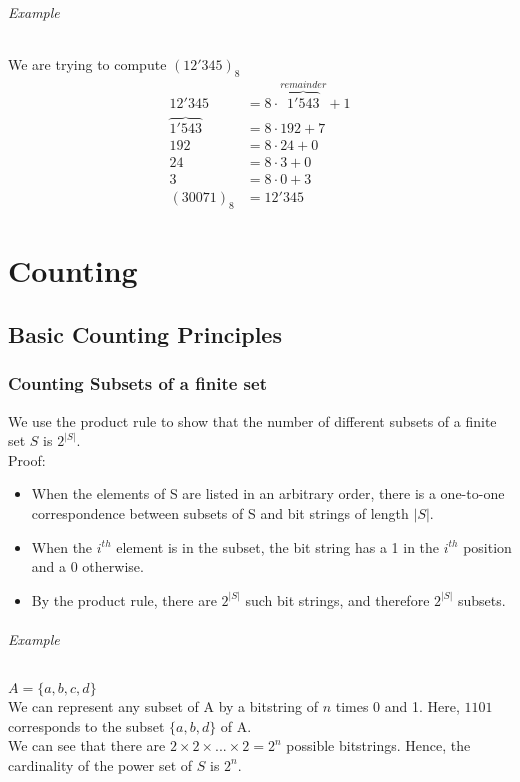 \documentclass[10pt,a4paper]{book}
\begin{document}
\paragraph*{Example}
We are trying to compute $(12'345)_8$
\begin{align*}
12'345 &= 8\cdot \overbrace{1'543}^{remainder} + 1\\
\overbrace{1'543} &= 8\cdot 192 + 7\\
192 &= 8\cdot 24 + 0\\
24 &= 8\cdot 3 + 0\\
3 &= 8\cdot 0 + 3\\
(30071)_8 &= 12'345
\end{align*}


\part{Counting}
\chapter{Basic Counting Principles}
\section{Counting Subsets of a finite set}
We use the product rule to show that the number of different subsets of a finite set $S$ is $2^{|S|}$.\\
Proof:
\begin{itemize}
\item When the elements of S are listed in an arbitrary order, there is a one-to-one correspondence between subsets of S and bit strings of length $|S|$.
\item When the $i^{th}$ element is in the subset, the bit string has a 1 in the $i^{th}$ position and a 0 otherwise.
\item By the product rule, there are $2^{|S|}$ such bit strings, and therefore $2^{|S|}$ subsets.
\end{itemize}
\paragraph*{Example}
$A = \{a,b,c,d\}$\\
We can represent any subset of A by a bitstring of $n$ times 0 and 1. Here, $1101$ corresponds to the subset $\{a,b,d\}$ of A.\\
We can see that there are $2\times 2\times ... \times 2 = 2^n$ possible bitstrings. Hence, the cardinality of the power set of $S$ is $2^n$.
\end{document}
